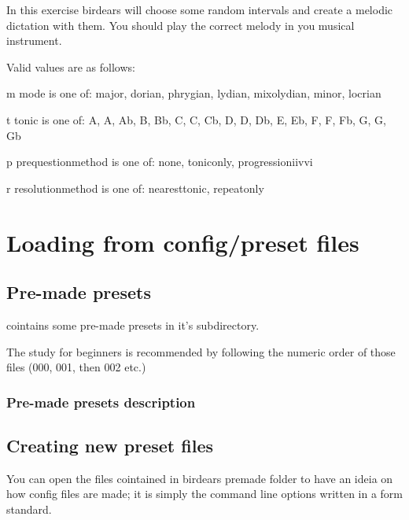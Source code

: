 \documentclass[letterpaper,10pt,english]{sphinxmanual}
\begin{document}
\begin{sphinxVerbatim}[commandchars=\\\{\}]
  In this exercise birdears will choose some random intervals and create a
  melodic dictation with them. You should play the correct melody in you
  musical instrument.

  Valid values are as follows:

  \PYGZhy{}m \PYGZlt{}mode\PYGZgt{} is one of: major, dorian, phrygian, lydian, mixolydian, minor,
  locrian

  \PYGZhy{}t \PYGZlt{}tonic\PYGZgt{} is one of: A, A\PYGZsh{}, Ab, B, Bb, C, C\PYGZsh{}, Cb, D, D\PYGZsh{}, Db, E, Eb, F,
  F\PYGZsh{}, Fb, G, G\PYGZsh{}, Gb

  \PYGZhy{}p \PYGZlt{}prequestion\PYGZus{}method\PYGZgt{} is one of: none, tonic\PYGZus{}only, progression\PYGZus{}i\PYGZus{}iv\PYGZus{}v\PYGZus{}i

  \PYGZhy{}r \PYGZlt{}resolution\PYGZus{}method\PYGZgt{} is one of: nearest\PYGZus{}tonic, repeat\PYGZus{}only
\end{sphinxVerbatim}



\section{Loading from config/preset files}
\label{\detokenize{index:loading-from-config-preset-files}}

\subsection{Pre-made presets}
\label{\detokenize{index:pre-made-presets}}
 cointains some pre-made presets in it’s 
subdirectory.

The study for beginners is recommended by following the numeric order of
those files (000, 001, then 002 etc.)


\subsubsection{Pre-made presets description}
\label{\detokenize{index:pre-made-presets-description}}


\subsection{Creating new preset files}
\label{\detokenize{index:creating-new-preset-files}}
You can open the files cointained in birdears premade 
folder to have an ideia on how config files are made; it is simply the
command line options written in a form  standard.
\end{document}
